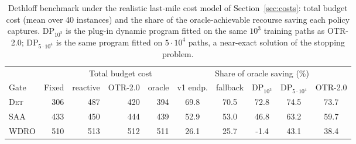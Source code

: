 \begin{table}[t]
\caption{Dethloff benchmark under the realistic last-mile cost model of
Section~\ref{sec:costs}: total budget cost (mean over 40 instances) and
the share of the oracle-achievable recourse saving each policy captures.
DP$_{10^3}$ is the plug-in dynamic program fitted on the same $10^3$
training paths as OTR-2.0; DP$_{5\cdot10^4}$ is the same program fitted
on $5\cdot10^4$ paths, a near-exact solution of the stopping problem.}
\label{tab:realistic}
\centering
\footnotesize
\setlength{\tabcolsep}{3pt}
\begin{tabular}{lrrrr ccccc}
\toprule
& & \multicolumn{3}{c}{Total budget cost} &
\multicolumn{5}{c}{Share of oracle saving (\%)} \\
\cmidrule(lr){3-5}\cmidrule(lr){6-10}
Gate & Fixed & reactive & OTR-2.0 & oracle &
v1 endp. & fallback & DP$_{10^3}$ & DP$_{5\cdot10^4}$ & OTR-2.0 \\
\midrule
\textsc{Det} & 306 & 487 & 420 & 394 & 69.8 & 70.5 & 72.8 & 74.5 & 73.7 \\
\textsc{SAA} & 433 & 450 & 444 & 439 & 52.9 & 53.0 & 46.8 & 63.2 & 59.7 \\
\textsc{WDRO} & 510 & 513 & 512 & 511 & 26.1 & 25.7 & -1.4 & 43.1 & 38.4 \\
\bottomrule
\end{tabular}
\end{table}
